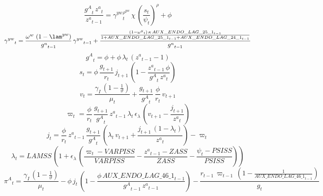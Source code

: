 \begin{dmath}
\frac{{{g^A}}_{t}\, {{z^a}}_{t}}{{{z^a}}_{t-1}}={{\gamma^{yw}}}_{t}^{{{\rho^{yw}}}}\, {{\chi}}\, \left(\frac{{{s}}_{t}}{{{\psi}}_{t}}\right)^{{{\rho}}}+{{\phi}}
\end{dmath}
\begin{dmath}
{{\gamma^{yw}}}_{t}=\frac{{{\omega^w}}\, \left(1-{{\lam^{yw}}}\right)}{{{g^n}}_{t-1}}\, {{\gamma^{yw}}}_{t-1}+\frac{\frac{\left(1-{{\omega^{y}}}_{t}\right)\, {{\kappa}}\, {AUX\_ENDO\_LAG\_25\_1}_{t-1}}{1+{AUX\_ENDO\_LAG\_25\_1}_{t-1}+{AUX\_ENDO\_LAG\_24\_1}_{t-1}}}{{{g^n}}_{t-1}}
\end{dmath}
\begin{dmath}
{{g^A}}_{t}={{\phi}}+{{\phi}}\, {{\lambda}}_{t}\, \left({{z^a}}_{t-1}-1\right)
\end{dmath}
\begin{dmath}
{{s}}_{t}={{\phi}}\, \frac{{{g}}_{t+1}}{{{r}}_{t}}\, {{j}}_{t+1}\, \left(1-\frac{{{z^a}}_{t-1}\, {{\phi}}}{{{g^A}}_{t}\, {{z^a}}_{t}}\right)
\end{dmath}
\begin{dmath}
{{v}}_{t}=\frac{{{\gamma_I}}\, \left(1-\frac{1}{{{\vartheta}}}\right)}{{{\mu}}_{t}}+\frac{{{g}}_{t+1}}{{{g^A}}_{t}}\, \frac{{{\phi}}}{{{r}}_{t}}\, {{v}}_{t+1}
\end{dmath}
\begin{dmath}
{{\varpi}}_{t}=\frac{{{\phi}}}{{{r}}_{t}}\, \frac{{{g}}_{t+1}}{{{g^A}}_{t}}\, {{z^a}}_{t-1}\, {{\lambda}}_{t}\, {{\epsilon_{\lambda}}}\, \left({{v}}_{t+1}-\frac{{{j}}_{t+1}}{{{z^a}}_{t}}\right)
\end{dmath}
\begin{dmath}
{{j}}_{t}=\frac{{{\phi}}}{{{r}}_{t}}\, {{z^a}}_{t-1}\, \frac{{{g}}_{t+1}}{{{g^A}}_{t}}\, \left({{\lambda}}_{t}\, {{v}}_{t+1}+\frac{{{j}}_{t+1}\, \left(1-{{\lambda}}_{t}\right)}{{{z^a}}_{t}}\right)-{{\varpi}}_{t}
\end{dmath}
\begin{dmath}
{{\lambda}}_{t}={{LAMSS}}\, \left(1+{{\epsilon_{\lambda}}}\, \left(\frac{{{\varpi}}_{t}-{{VARPISS}}}{{{VARPISS}}}-\frac{{{z^a}}_{t-1}-{{ZASS}}}{{{ZASS}}}-\frac{{{\psi}}_{t}-{{PSISS}}}{{{PSISS}}}\right)\right)
\end{dmath}
\begin{dmath}
{{\pi^{A}}}_{t}=\frac{{{\gamma_I}}\, \left(1-\frac{1}{{{\vartheta}}}\right)}{{{\mu}}_{t}}-{{\phi}}\, {{j}}_{t}\, \left(1-\frac{{{\phi}}\, {AUX\_ENDO\_LAG\_46\_1}_{t-1}}{{{g^A}}_{t-1}\, {{z^a}}_{t-1}}\right)-\frac{{{r}}_{t-1}\, {{\varpi}}_{t-1}\, \left(1-\frac{1}{{AUX\_ENDO\_LAG\_46\_1}_{t-1}}\right)}{{{g}}_{t}}
\end{dmath}
